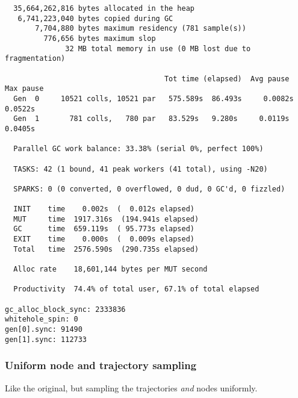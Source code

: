 {\small
\begin{verbatim}
  35,664,262,816 bytes allocated in the heap
   6,741,223,040 bytes copied during GC
       7,704,880 bytes maximum residency (781 sample(s))
         776,656 bytes maximum slop
              32 MB total memory in use (0 MB lost due to fragmentation)

                                     Tot time (elapsed)  Avg pause  Max pause
  Gen  0     10521 colls, 10521 par   575.589s  86.493s     0.0082s    0.0522s
  Gen  1       781 colls,   780 par   83.529s   9.280s     0.0119s    0.0405s

  Parallel GC work balance: 33.38% (serial 0%, perfect 100%)

  TASKS: 42 (1 bound, 41 peak workers (41 total), using -N20)

  SPARKS: 0 (0 converted, 0 overflowed, 0 dud, 0 GC'd, 0 fizzled)

  INIT    time    0.002s  (  0.012s elapsed)
  MUT     time  1917.316s  (194.941s elapsed)
  GC      time  659.119s  ( 95.773s elapsed)
  EXIT    time    0.000s  (  0.009s elapsed)
  Total   time  2576.590s  (290.735s elapsed)

  Alloc rate    18,601,144 bytes per MUT second

  Productivity  74.4% of total user, 67.1% of total elapsed

gc_alloc_block_sync: 2333836
whitehole_spin: 0
gen[0].sync: 91490
gen[1].sync: 112733
\end{verbatim}
}
\subsubsection{Uniform node and trajectory sampling}
\label{ssub:uniform_node_and_trajectory_sampling}

Like the original, but sampling the trajectories \emph{and} nodes uniformly.

